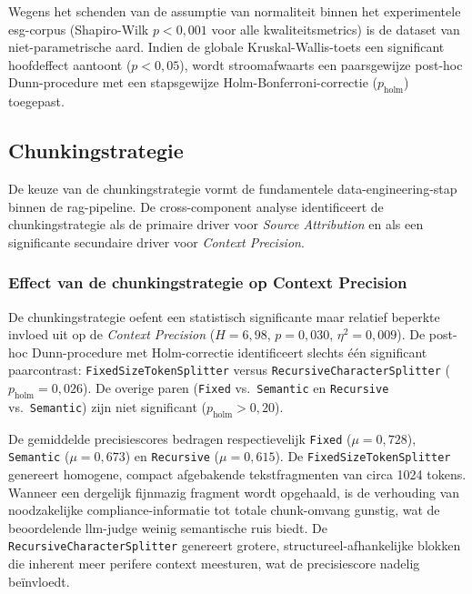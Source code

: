 Wegens het schenden van de assumptie van normaliteit binnen het experimentele \gls{esg}-corpus (Shapiro-Wilk $p < 0{,}001$ voor alle kwaliteitsmetrics) is de dataset van niet-parametrische aard. Indien de globale Kruskal-Wallis-toets een significant hoofdeffect aantoont ($p < 0{,}05$), wordt stroomafwaarts een paarsgewijze post-hoc Dunn-procedure met een stapsgewijze Holm-Bonferroni-correctie ($p_{\text{holm}}$) toegepast.

\subsection{Chunkingstrategie}
\label{subsec:chunker-prestaties}

De keuze van de chunkingstrategie vormt de fundamentele data-engineering-stap binnen de \gls{rag}-pipeline. De cross-component analyse identificeert de chunkingstrategie als de primaire driver voor \textit{Source Attribution} en als een significante secundaire driver voor \textit{Context Precision}.

\subsubsection{Effect van de chunkingstrategie op Context Precision}
\label{subsec:chunker-context-precision}

De chunkingstrategie oefent een statistisch significante maar relatief beperkte invloed uit op de \textit{Context Precision} ($H = 6{,}98$, $p = 0{,}030$, $\eta^2 = 0{,}009$). De post-hoc Dunn-procedure met Holm-correctie identificeert slechts één significant paarcontrast: \texttt{FixedSizeTokenSplitter} versus \texttt{RecursiveCharacterSplitter} ($p_{\text{holm}} = 0{,}026$). De overige paren (\texttt{Fixed} vs.\ \texttt{Semantic} en \texttt{Recursive} vs.\ \texttt{Semantic}) zijn niet significant ($p_{\text{holm}} > 0{,}20$).

De gemiddelde precisiescores bedragen respectievelijk \texttt{Fixed} ($\mu = 0{,}728$), \texttt{Semantic} ($\mu = 0{,}673$) en \texttt{Recursive} ($\mu = 0{,}615$). De \texttt{FixedSizeTokenSplitter} genereert homogene, compact afgebakende tekstfragmenten van circa 1024 tokens. Wanneer een dergelijk fijnmazig fragment wordt opgehaald, is de verhouding van noodzakelijke compliance-informatie tot totale chunk-omvang gunstig, wat de beoordelende \gls{llm}-judge weinig semantische ruis biedt. De \texttt{RecursiveCharacterSplitter} genereert grotere, structureel-afhankelijke blokken die inherent meer perifere context meesturen, wat de precisiescore nadelig beïnvloedt.

